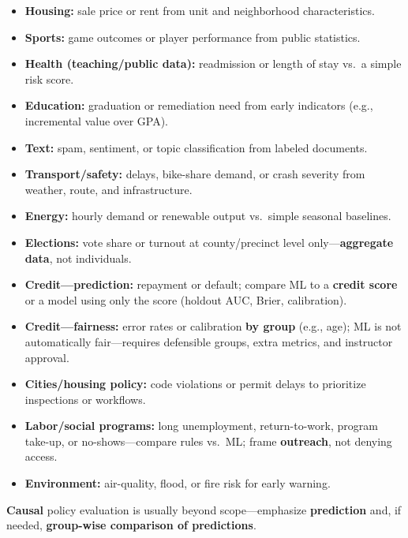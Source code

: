 \documentclass[11pt,letterpaper]{article}
\begin{document}
\begin{itemize}
  \item \textbf{Housing:} sale price or rent from unit and neighborhood characteristics.
  \item \textbf{Sports:} game outcomes or player performance from public statistics.
  \item \textbf{Health (teaching/public data):} readmission or length of stay vs.\ a simple risk score.
  \item \textbf{Education:} graduation or remediation need from early indicators (e.g., incremental value over GPA).
  \item \textbf{Text:} spam, sentiment, or topic classification from labeled documents.
  \item \textbf{Transport/safety:} delays, bike-share demand, or crash severity from weather, route, and infrastructure.
  \item \textbf{Energy:} hourly demand or renewable output vs.\ simple seasonal baselines.
  \item \textbf{Elections:} vote share or turnout at county/precinct level only---\textbf{aggregate data}, not individuals.
  \item \textbf{Credit---prediction:} repayment or default; compare ML to a \textbf{credit score} or a model using only the score (holdout AUC, Brier, calibration).
  \item \textbf{Credit---fairness:} error rates or calibration \textbf{by group} (e.g., age); ML is not automatically fair---requires defensible groups, extra metrics, and instructor approval.
  \item \textbf{Cities/housing policy:} code violations or permit delays to prioritize inspections or workflows.
  \item \textbf{Labor/social programs:} long unemployment, return-to-work, program take-up, or no-shows---compare rules vs.\ ML; frame \textbf{outreach}, not denying access.
  \item \textbf{Environment:} air-quality, flood, or fire risk for early warning.
\end{itemize}

\medskip
\noindent \textbf{Causal} policy evaluation is usually beyond scope---emphasize \textbf{prediction} and, if needed, \textbf{group-wise comparison of predictions}.
\end{document}
